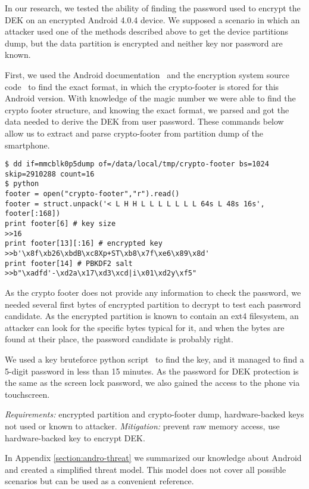 In our research, we tested the ability of finding the password used to encrypt the DEK on an encrypted Android 4.0.4 device. We supposed a scenario in which an attacker used one of the methods described above to get the device partitions dump, but the data partition is encrypted and neither key nor password are known. 

First, we used the Android documentation~\cite{android2} and the encryption system source code~\cite{android5} to find the exact format, in which the crypto-footer is stored for this Android version. With knowledge of the magic number we were able to find the crypto footer structure, and knowing the exact format, we parsed and got the data needed to derive the DEK from user password. 
These commands below allow us to extract and parse crypto-footer from partition dump of the smartphone.

\begin{lstlisting}
$ dd if=mmcblk0p5dump of=/data/local/tmp/crypto-footer bs=1024 skip=2910288 count=16
$ python
footer = open("crypto-footer","r").read()
footer = struct.unpack('< L H H L L L L L L L 64s L 48s 16s', footer[:168])
print footer[6] # key size
>>16
print footer[13][:16] # encrypted key
>>b'\x8f\xb26\xbdB\xc8Xp+ST\xb8\x7f\xe6\x89\x8d'
print footer[14] # PBKDF2 salt
>>b"\xadfd'-\xd2a\x17\xd3\xcd|i\x01\xd2y\xf5"
\end{lstlisting}

As the crypto footer does not provide any information to check the password, we needed several first bytes of encrypted partition to decrypt to test each password candidate. As the encrypted partition is known to contain an ext4 filesystem, an attacker can look for the specific bytes typical for it, and when the bytes are found at their place, the password candidate is probably right.

We used a key bruteforce python script~\cite{android6} to find the key, and it managed to find a 5-digit password in less than 15 minutes. As the password for DEK protection is the same as the screen lock password, we also gained the access to the phone via touchscreen.

\textsl{Requirements:} encrypted partition and crypto-footer dump, hardware-backed keys not used or known to attacker.
\textsl{Mitigation:} prevent raw memory access, use hardware-backed key to encrypt DEK.


In Appendix \ref{section:andro-threat} we summarized our knowledge about Android and created a simplified threat model. This model does not cover all possible scenarios but can be used as a convenient reference.



